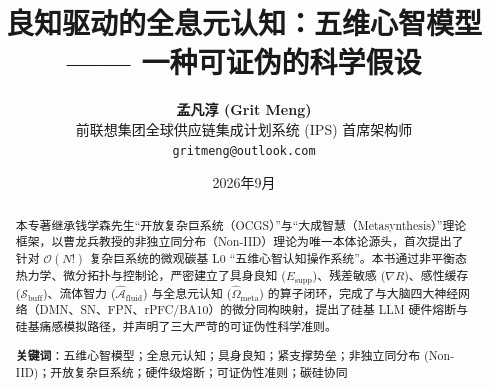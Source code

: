 \documentclass[11pt,a4paper]{article}
\title{\textbf{良知驱动的全息元认知：五维心智模型}\\
\large —— 一种可证伪的科学假设}
\author{\textbf{孟凡淳 (Grit Meng)}\\
前联想集团全球供应链集成计划系统 (IPS) 首席架构师\\
\texttt{gritmeng@outlook.com}}
\date{2026年9月}
\begin{document}
\maketitle

\begin{abstract}
本专著继承钱学森先生“开放复杂巨系统（OCGS）”与“大成智慧（Metasynthesis）”理论框架，以曹龙兵教授的非独立同分布（Non-IID）理论为唯一本体论源头，首次提出了针对 $\mathcal{O}(N!)$ 复杂巨系统的微观碳基 L0 “五维心智认知操作系统”。本书通过非平衡态热力学、微分拓扑与控制论，严密建立了具身良知 ($E_{\text{supp}}$)、残差敏感 ($\nabla R$)、感性缓存 ($\mathcal{S}_{\text{buff}}$)、流体智力 ($\hat{\mathcal{A}}_{\text{fluid}}$) 与全息元认知 ($\hat{\Omega}_{\text{meta}}$) 的算子闭环，完成了与大脑四大神经网络（DMN、SN、FPN、rPFC/BA10）的微分同构映射，提出了硅基 LLM 硬件熔断与硅基痛感模拟路径，并声明了三大严苛的可证伪性科学准则。

\vspace{0.5em}
\noindent\textbf{关键词}：五维心智模型；全息元认知；具身良知；紧支撑势垒；非独立同分布 (Non-IID)；开放复杂巨系统；硬件级熔断；可证伪性准则；碳硅协同
\end{abstract}
\end{document}
